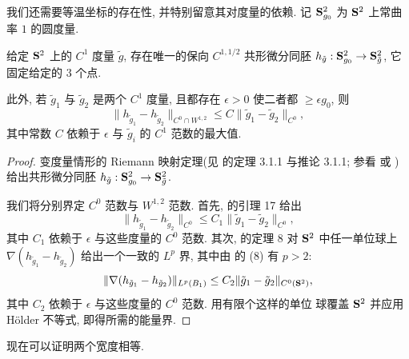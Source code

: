我们还需要等温坐标的存在性, 并特别留意其对度量的依赖. 记
$\mathbf{S}^2_{g_0}$ 为 $\mathbf{S}^2$ 上常曲率 $1$ 的圆度量.

\begin{lemma}
\label{lem:5.22}
给定 $\mathbf{S}^2$ 上的 $C^1$ 度量 $\tilde{g}$, 存在唯一的保向
$C^{1,1/2}$ 共形微分同胚
$h_{\tilde{g}}:\mathbf{S}^2_{g_0}\to\mathbf{S}^2_{\tilde{g}}$, 它固定给定的 $3$ 个点.

此外, 若 $\tilde{g}_1$ 与 $\tilde{g}_2$ 是两个 $C^1$ 度量, 且都存在
$\epsilon>0$ 使二者都 $\geq\epsilon g_0$, 则
\begin{equation}
\|h_{\tilde{g}_1}-h_{\tilde{g}_2}\|_{C^0\cap W^{1,2}}
\leq C\|\tilde{g}_1-\tilde{g}_2\|_{C^0},
\label{eq:5.94}
\end{equation}
其中常数 $C$ 依赖于 $\epsilon$ 与 $\tilde{g}_i$ 的 $C^1$ 范数的最大值.
\end{lemma}

\begin{proof}
变度量情形的 Riemann 映射定理(见 \cite{Jo} 的定理 3.1.1 与推论 3.1.1;
参看 \cite{ABe} 或 \cite{Mo2})给出共形微分同胚
$h_{\tilde{g}}:\mathbf{S}^2_{g_0}\to\mathbf{S}^2_{\tilde{g}}$.

我们将分别界定 $C^0$ 范数与 $W^{1,2}$ 范数. 首先, \cite{ABe} 的引理 17
给出
\begin{equation}
\|h_{\tilde{g}_1}-h_{\tilde{g}_2}\|_{C^0}
\leq C_1\|\tilde{g}_1-\tilde{g}_2\|_{C^0},
\label{eq:5.95}
\end{equation}
其中 $C_1$ 依赖于 $\epsilon$ 与这些度量的 $C^0$ 范数. 其次,
\cite{ABe} 的定理 8 对 $\mathbf{S}^2$ 中任一单位球上
$\nabla(h_{\tilde{g}_1}-h_{\tilde{g}_2})$ 给出一个一致的 $L^p$ 界,
其中由 \cite{ABe} 的 (8) 有 $p>2$:
\begin{equation}
\|\nabla(h_{\tilde{g}_1}-h_{\tilde{g}_2})\|_{L^p(B_1)}
\leq C_2\|\tilde{g}_1-\tilde{g}_2\|_{C^0(\mathbf{S}^2)},
\label{eq:5.96}
\end{equation}
其中 $C_2$ 依赖于 $\epsilon$ 与这些度量的 $C^0$ 范数. 用有限个这样的单位
球覆盖 $\mathbf{S}^2$ 并应用 H\"older 不等式, 即得所需的能量界.
\end{proof}

现在可以证明两个宽度相等.

